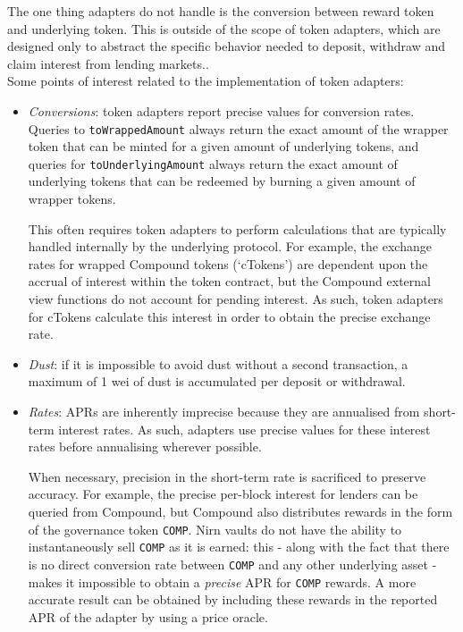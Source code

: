 \documentclass{article}
\begin{document}
\noindent
The one thing adapters do not handle is the conversion between reward token and underlying token. This is outside of the scope of token adapters, which are designed only to abstract the specific behavior needed to deposit, withdraw and claim interest from lending markets..\\

\noindent
Some points of interest related to the implementation of token adapters:

\begin{itemize}
    \item \textit{Conversions}: token adapters report precise values for conversion rates. Queries to \texttt{toWrappedAmount} always return the exact amount of the wrapper token that can be minted for a given amount of underlying tokens, and queries for \texttt{toUnderlyingAmount} always return the exact amount of underlying tokens that can be redeemed by burning a given amount of wrapper tokens.

This often requires token adapters to perform calculations that are typically handled internally by the underlying protocol. For example, the exchange rates for wrapped Compound tokens (`cTokens') are dependent upon the accrual of interest within the token contract, but the Compound external view functions do not account for pending interest. As such, token adapters for cTokens calculate this interest in order to obtain the precise exchange rate.

    \item \textit{Dust}: if it is impossible to avoid dust without a second transaction, a maximum of 1 wei of dust is accumulated per deposit or withdrawal.
    
    \item \textit{Rates}: APRs are inherently imprecise because they are annualised from short-term interest rates. As such, adapters use precise values for these interest rates before annualising wherever possible.
    
    When necessary, precision in the short-term rate is sacrificed to preserve accuracy. For example, the precise per-block interest for lenders can be queried from Compound, but Compound also distributes rewards in the form of the governance token \texttt{COMP}. Nirn vaults do not have the ability to instantaneously sell \texttt{COMP} as it is earned: this - along with the fact that there is no direct conversion rate between \texttt{COMP} and any other underlying asset - makes it impossible to obtain a \textit{precise} APR for \texttt{COMP} rewards. A more accurate result can be obtained by including these rewards in the reported APR of the adapter by using a price oracle.
\end{itemize}
\end{document}
